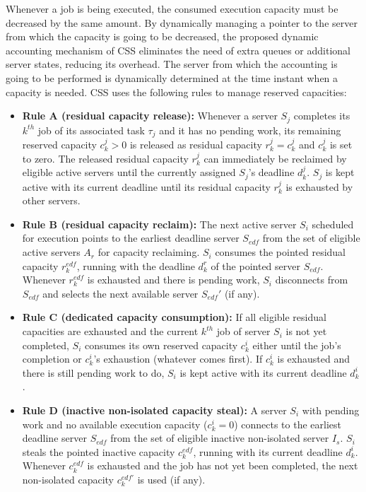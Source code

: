 \documentclass[10pt,twocolumn]{article}
\begin{document}
Whenever a job is being executed, the consumed execution capacity must be decreased by the same amount. By dynamically managing a pointer to the server from which the capacity is going to be decreased, the proposed dynamic accounting mechanism of CSS eliminates the need of extra queues or additional server states, reducing its overhead. The server from which the accounting is going to be performed is dynamically determined at the time instant when a capacity is needed. CSS uses the following rules to manage reserved capacities:

\begin{itemize}
\item\textbf{Rule A (residual capacity release):} Whenever a server $S_j$ completes its $k^{th}$ job of its associated task $\tau_j$ and it has no pending work, its remaining reserved capacity $c^j_k > 0$ is released as residual capacity $r^j_k = c^j_k$ and $c^j_k$ is set to zero. The released residual capacity $r^j_k$ can immediately be reclaimed by eligible active servers until the currently assigned $S_j$'s deadline $d^j_k$. $S_j$ is kept active with its current deadline until its residual capacity $r^j_k$ is exhausted by other servers.
\item\textbf{Rule B (residual capacity reclaim):} The next active server $S_i$ scheduled for execution points to the earliest deadline server $S_{edf}$ from the set of eligible active servers $A_r$ for capacity reclaiming. $S_i$ consumes the pointed residual capacity $r^{edf}_k$, running with the deadline $d^r_k$ of the pointed server $S_{edf}$. Whenever $r^{edf}_k$ is exhausted and there is pending work, $S_i$ disconnects from $S_{edf}$ and selects the next available server $S_{edf}'$ (if any).
\item\textbf{Rule C (dedicated capacity consumption):} If all eligible residual capacities are exhausted and the current $k^{th}$ job of server $S_i$ is not yet completed, $S_i$ consumes its own reserved capacity $c^i_k$ either until the job's completion or $c^i_k$'s exhaustion (whatever comes first). If $c^i_k$ is exhausted and there is still pending work to do, $S_i$ is kept active with its current deadline $d^i_k$.
\item\textbf{Rule D (inactive non-isolated capacity steal):} A server $S_i$ with pending work and no available execution capacity ($c^i_k = 0$) connects to the earliest deadline server $S_{edf}$ from the set of eligible inactive non-isolated server $I_s$. $S_i$ steals the pointed inactive capacity $c^{edf}_k$, running with its current deadline $d^i_k$. Whenever $c^{edf}_k$ is exhausted and the job has not yet been completed, the next non-isolated capacity $c^{edf'}_k$ is used (if any). 
\end{itemize}
\end{document}
